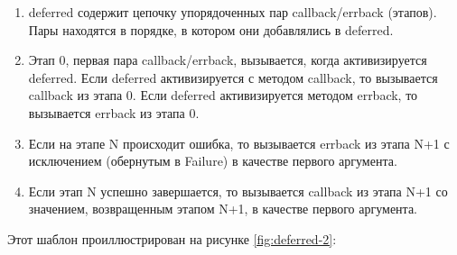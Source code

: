 \begin{enumerate}

\item deferred содержит цепочку упорядоченных пар callback/errback (этапов). 
Пары находятся в порядке, в котором они добавлялись в deferred.

\item Этап 0, первая пара callback/errback, вызывается, когда 
активизируется deferred. Если deferred активизируется с методом 
callback, то вызывается callback из этапа 0. Если deferred 
активизируется методом errback, то вызывается errback из этапа 0. 

\item Если на этапе N происходит ошибка, то 
вызывается errback из этапа N+1 с исключением (обернутым в Failure) в 
качестве первого аргумента.

\item Если этап N успешно завершается, то вызывается callback из 
этапа N+1 со значением, возвращенным этапом N+1, в качестве первого аргумента.

\end{enumerate}


Этот шаблон проиллюстрирован на рисунке \ref{fig:deferred-2}:

